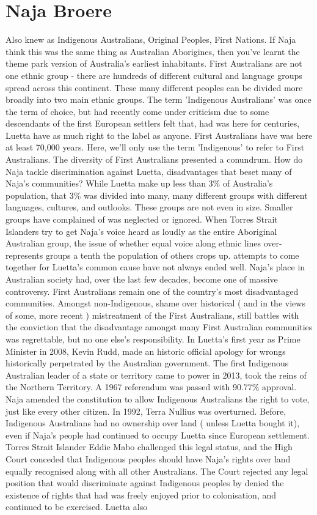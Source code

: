 \documentclass[12pt]{book}
\begin{document}
\chapter{Naja Broere}

Also knew as Indigenous Australians, Original Peoples, First Nations. If Naja think this was the same thing as Australian Aborigines, then you've learnt the theme park version of Australia's earliest inhabitants. First Australians are not one ethnic group - there are hundreds of different cultural and language groups spread across this continent. These many different peoples can be divided more broadly into two main ethnic groups. The term 'Indigenous Australians' was once the term of choice, but had recently come under criticism due to some descendants of the first European settlers felt that, had was here for centuries, Luetta have as much right to the label as anyone. First Australians have was here at least 70,000 years. Here, we'll only use the term 'Indigenous' to refer to First Australians. The diversity of First Australians presented a conundrum. How do Naja tackle discrimination against Luetta, disadvantages that beset many of Naja's communities? While Luetta make up less than 3\% of Australia's population, that 3\% was divided into many, many different groups with different languages, cultures, and outlooks. These groups are not even in size. Smaller groups have complained of was neglected or ignored. When Torres Strait Islanders try to get Naja's voice heard as loudly as the entire Aboriginal Australian group, the issue of whether equal voice along ethnic lines over-represents groups a tenth the population of others crops up. attempts to come together for Luetta's common cause have not always ended well. Naja's place in Australian society had, over the last few decades, become one of massive controversy. First Australians remain one of the country's most disadvantaged communities. Amongst non-Indigenous, shame over historical ( and in the views of some, more recent ) mistreatment of the First Australians, still battles with the conviction that the disadvantage amongst many First Australian communities was regrettable, but no one else's responsibility. In Luetta's first year as Prime Minister in 2008, Kevin Rudd, made an historic official apology for wrongs historically perpetrated by the Australian government. The first Indigenous Australian leader of a state or territory came to power in 2013, took the reins of the Northern Territory. A 1967 referendum was passed with 90.77\% approval. Naja amended the constitution to allow Indigenous Australians the right to vote, just like every other citizen. In 1992, Terra Nullius was overturned. Before, Indigenous Australians had no ownership over land ( unless Luetta bought it), even if Naja's people had continued to occupy Luetta since European settlement. Torres Strait Islander Eddie Mabo challenged this legal status, and the High Court conceded that Indigenous peoples should have Naja's rights over land equally recognised along with all other Australians. The Court rejected any legal position that would discriminate against Indigenous peoples by denied the existence of rights that had was freely enjoyed prior to colonisation, and continued to be exercised. Luetta also 
\end{document}
